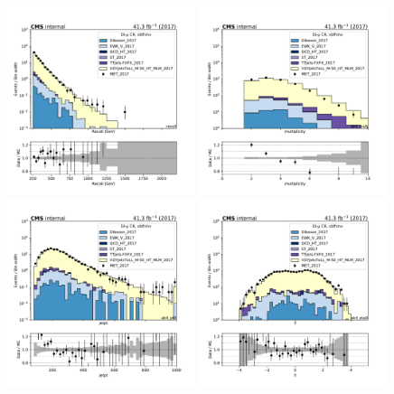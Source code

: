 {\begin{figure}[htbp]
    \begin{center}
        \includegraphics[width=0.49\textwidth]{fig/datamc/cr_2m_vbf/cr_2m_vbf_recoil_losf_2017.pdf}
        \includegraphics[width=0.49\textwidth]{fig/datamc/cr_2m_vbf/cr_2m_vbf_ak4_mult_losf_2017.pdf} \\
        \includegraphics[width=0.49\textwidth]{fig/datamc/cr_2m_vbf/cr_2m_vbf_ak4_pt0_losf_2017.pdf}
        \includegraphics[width=0.49\textwidth]{fig/datamc/cr_2m_vbf/cr_2m_vbf_ak4_eta0_losf_2017.pdf}

\end{center}
\end{figure}}
